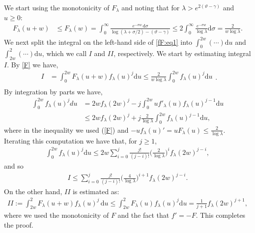 \documentclass[a4paper,reqno,11pt]{amsart}
\makeatletter
\renewenvironment{proof}[1][\proofname]{\par
\pushQED{\qed}%
\normalfont \topsep4\p@\@plus4\p@\relax
\trivlist
\item[\hskip\labelsep
\bfseries
#1\@addpunct{.}]\ignorespaces
}{%
\popQED\endtrivlist\@endpefalse
}
\numberwithin{equation}{section}
\theoremstyle{mytheorem}
\newcommand{\gl}{\lambda}
\newcommand{\gs}{\sigma}
\renewcommand{\theta}{\vartheta}
\newcommand\dd{\mathrm{d}}
\makeatother
\begin{document}
{\begin{proof}
We start using the monotonicity of $F_\lambda$ and noting that for $\lambda> \text{$e^{2(\theta-\gamma)}$}$
and $u\geq 0$:
    \begin{align}\label{F}
    F_\gl(u+w)
     & \le F_\gl(w) = 
     \int^\infty_0\frac{ e^{-\gs w} \,\dd\gs}{\log(\gl+\gs/2)-(\theta-\gamma)} 
      \le 2 \int^\infty_0  \frac{ e^{-\gs w}}{\log\gl} \dd\gs
     = \frac{2}{w\log\lambda} .
    \end{align}
    We next split the integral on the left-hand side of \eqref{fF:eq1} into $\int_0^{2w}(\cdots) \dd u$ 
    and $\int_{2w}^{2}( \cdots )\dd u$, which we call $I$ and $II$, respectively. 
    We start by estimating integral $I$. By \eqref{F} we have, 
    \begin{equation}
    \begin{split}
        I & = 
        \int^{2w}_0 
        F_\gl(u+w)
        f_\gl(u)^j \dd u
        \le \frac{2}{w \log\gl}
        \int^{2w}_0
        f_\gl(u)^j \dd u\\
    \end{split}.
    \end{equation}
     By integration by parts we have,
    \begin{equation*}
    \begin{split}
        \int^{2w}_0 f_\gl(u)^jdu 
        & = 2w f_\gl(2w)^j
        -  j \int^{2w}_0 uf'_\gl(u)f_\gl(u)^{j-1} \dd u\\
        & \le 2w f_\gl (2w )^j 
           +j\frac{2}{\log \gl}\int^{2w}_0f_\gl(u)^{j-1} \dd u,
    \end{split}
    \end{equation*}
    where in the inequality we used (\ref{F}) and $-u f_\gl(u)'= uF_\gl(u)\le \frac{2}{\log\gl}$. Iterating this computation we have that, for $j\ge 1$,
\begin{align*}
    \int^{2w}_0 
    f_\gl(u)^j \dd u
    \le  2w \sum^j_{i=0}
    \frac{j!}{(j-i)!}
    \Big( \frac{2}{\log \gl} \Big)^i
    f_\gl(2w)^{j-i},
\end{align*}
and so 
\begin{align*}
    I \le \sum^j_{i=0}\frac{j!}{(j-i)!} \Big( \frac{4}{\log \gl} \Big)^{i+1}f_\gl(2w)^{j-i}.
\end{align*}
  On the other hand, $II$ is estimated as:
\begin{align*}
    II :=\int_{2w}^{2}  F_\gl(u+w)  f_\gl(u)^j \,\dd u
    \leq \int^{2}_{2w}
    F_\gl(u)f_\gl(u)^j \dd u
    = \frac{1}{j+1}f_\gl(2w)^{j+1},
\end{align*}
   where we used the monotonicity of $F$ and the fact that $f'=-F$. This completes the proof. 
\end{proof}



}
\end{document}
